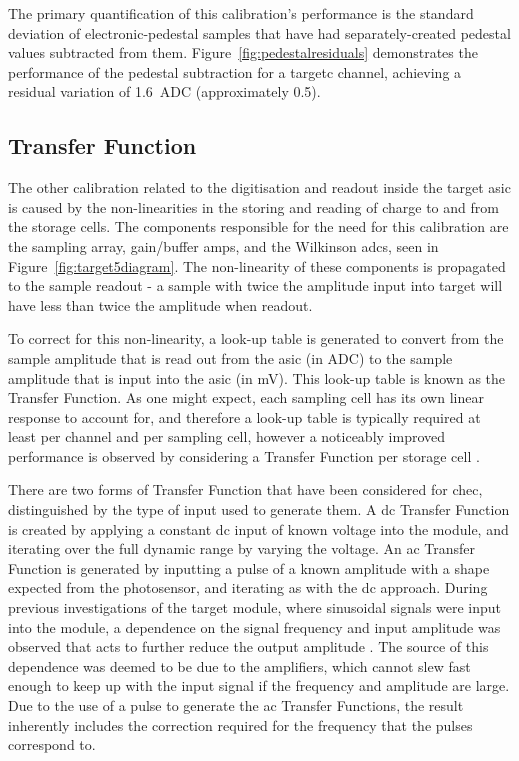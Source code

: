 The primary quantification of this calibration's performance is the standard deviation of electronic-pedestal samples that have had separately-created pedestal values subtracted from them. Figure~\ref{fig:pedestalresiduals} demonstrates the performance of the pedestal subtraction for a \gls{targetc} channel, achieving a residual variation of \SI{1.6}{ADC} (approximately \SI{0.5}{\pe}).

\subsection{Transfer Function}

The other calibration related to the digitisation and readout inside the \gls{target} \gls{asic} is caused by the non-linearities in the storing and reading of charge to and from the storage cells. The components responsible for the need for this calibration are the sampling array, gain/buffer amps, and the Wilkinson \glspl{adc}, seen in Figure~\ref{fig:target5diagram}. The non-linearity of these components is propagated to the sample readout - a sample with twice the amplitude input into \gls{target} will have less than twice the amplitude when readout.

To correct for this non-linearity, a look-up table is generated to convert from the sample amplitude that is read out from the \gls{asic} (in \si{ADC}) to the sample amplitude that is input into the \gls{asic} (in \si{mV}). This look-up table is known as the Transfer Function. As one might expect, each sampling cell has its own linear response to account for, and therefore a look-up table is typically required at least per channel and per sampling cell, however a noticeably improved performance is observed by considering a Transfer Function per storage cell .

There are two forms of Transfer Function that have been considered for \gls{chec}, distinguished by the type of input used to generate them. A \gls{dc} Transfer Function is created by applying a constant \gls{dc} input of known voltage into the module, and iterating over the full dynamic range by varying the voltage. An \gls{ac} Transfer Function is generated by inputting a pulse of a known amplitude with a shape expected from the photosensor, and iterating as with the \gls{dc} approach. During previous investigations of the \gls{target} module, where sinusoidal signals were input into the module, a dependence on the signal frequency and input amplitude was observed that acts to further reduce the output amplitude \cite{Bechtol2012}\cite{Albert2017}. The source of this dependence was deemed to be due to the amplifiers, which cannot slew fast enough to keep up with the input signal if the frequency and amplitude are large. Due to the use of a pulse to generate the \gls{ac} Transfer Functions, the result inherently includes the correction required for the frequency that the pulses correspond to. 

